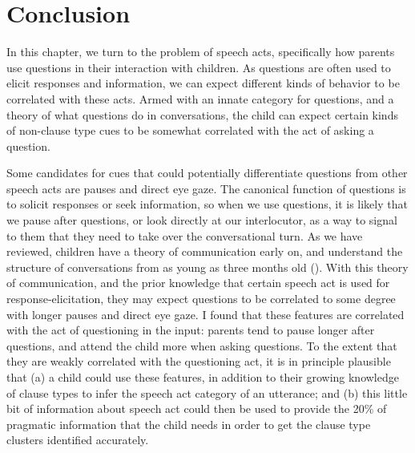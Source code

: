 \section{Conclusion}
\label{sec:engsp:discussion}
In this chapter, we turn to the problem of speech acts, specifically how parents use questions in their interaction with children. As questions are often used to elicit responses and information, we can expect different kinds of behavior to be correlated with these acts. Armed with an innate category for questions, and a theory of what questions do in conversations, the child can expect certain kinds of non-clause type cues to be somewhat correlated with the act of asking a question. 

Some candidates for cues that could potentially differentiate questions from other speech acts are pauses and direct eye gaze. The canonical function of questions is to solicit responses or seek information, so when we use questions, it is likely that we pause after questions, or look directly at our interlocutor, as a way to signal to them that they need to take over the conversational turn. As we have reviewed, children have a theory of communication early on, and understand the structure of conversations from as young as three months old (\cite{casillas2016corpus}). With this theory of communication, and the prior knowledge that certain speech act is used for response-elicitation, they may expect questions to be correlated to some degree with longer pauses and direct eye gaze. I found that these features are correlated with the act of questioning in the input: parents tend to pause longer after questions, and attend the child more when asking questions. To the extent that they are weakly correlated with the questioning act, it is in principle plausible that (a) a child could use these features, in addition to their growing knowledge of clause types to infer the speech act category of an utterance; and (b) this little bit of information about speech act could then be used to provide the 20\% of pragmatic information that the child needs in order to get the clause type clusters identified accurately.


